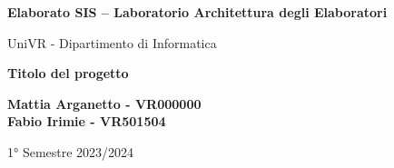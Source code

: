 \begin{titlepage}
	\begin{center}
		\vspace*{1cm}

		\Huge
		\textbf{Elaborato SIS – Laboratorio
			Architettura degli
			Elaboratori}

		\vspace{0.5cm}
		\LARGE
		UniVR - Dipartimento di Informatica

		\vspace{1cm}
		\huge
		\textbf{Titolo del progetto}
		\vspace{1.5cm}


		\vfill


		\vspace{0.8cm}

		\Large
		\textbf{Mattia Arganetto - VR000000}\\
		\textbf{Fabio Irimie - VR501504}

		\vspace{0.5cm}

		1° Semestre 2023/2024

	\end{center}
\end{titlepage}
